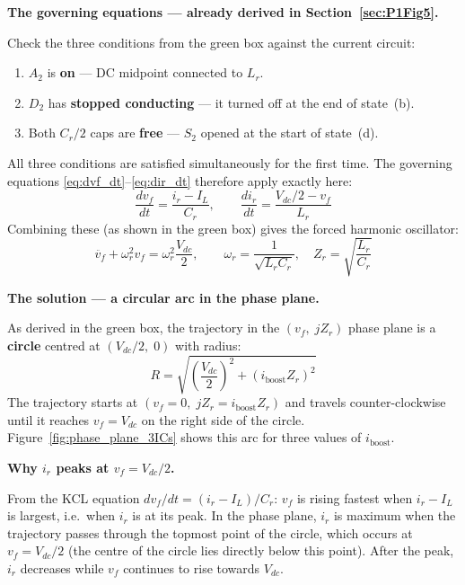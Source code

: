 \documentclass[12pt, a4paper]{article}
\def\,{ }%
\newcommand{\Vdc}{V_{dc}}
\newcommand{\vf}{v_f}
\newcommand{\ir}{i_r}
\newcommand{\IL}{I_L}
\newcommand{\Lr}{L_r}
\newcommand{\Cr}{C_r}
\newcommand{\omegar}{\omega_r}
\newcommand{\Zr}{Z_r}
\newcommand{\figref}[1]{Figure~\ref{#1}}
\begin{document}
\medskip
\textbf{The governing equations --- already derived in Section~\ref{sec:P1Fig5}.}

Check the three conditions from the green box against the current circuit:
\begin{enumerate}
    \item $A_2$ is \textbf{on} --- DC midpoint connected to $\Lr$. \checkmark
    \item $D_2$ has \textbf{stopped conducting} --- it turned off at the
          end of state~(b). \checkmark
    \item Both $\Cr/2$ caps are \textbf{free} --- $S_2$ opened at the
          start of state~(d). \checkmark
\end{enumerate}
All three conditions are satisfied simultaneously for the first time.
The governing equations \eqref{eq:dvf_dt}--\eqref{eq:dir_dt} therefore
apply exactly here:
\begin{equation*}
    \frac{d\vf}{dt} = \frac{\ir - \IL}{\Cr}, \qquad
    \frac{d\ir}{dt} = \frac{\Vdc/2 - \vf}{\Lr}
\end{equation*}
Combining these (as shown in the green box) gives the forced harmonic
oscillator:
\begin{equation*}
    \ddot{\vf} + \omegar^2\,\vf = \omegar^2\,\frac{\Vdc}{2},
    \qquad \omegar = \frac{1}{\sqrt{\Lr\Cr}},\quad \Zr = \sqrt{\frac{\Lr}{\Cr}}
\end{equation*}

\medskip
\textbf{The solution --- a circular arc in the phase plane.}

As derived in the green box, the trajectory in the
$({\vf},\; j\Zr)$ phase plane is a \textbf{circle} centred at
$(\Vdc/2,\; 0)$ with radius:
\begin{equation*}
    R = \sqrt{\left(\frac{\Vdc}{2}\right)^{\!2} + (i_\text{boost}\,\Zr)^2}
\end{equation*}
The trajectory starts at $(\vf = 0,\; j\Zr = i_\text{boost}\Zr)$ and
travels counter-clockwise until it reaches $\vf = \Vdc$ on the right side
of the circle.
\figref{fig:phase_plane_3ICs} shows this arc for three values of
$i_\text{boost}$.

\medskip
\textbf{Why $\ir$ peaks at $\vf = \Vdc/2$.}

From the KCL equation $d\vf/dt = (\ir - \IL)/\Cr$:
$\vf$ is rising fastest when $\ir - \IL$ is largest, i.e.\ when $\ir$ is
at its peak.
In the phase plane, $\ir$ is maximum when the trajectory passes through
the topmost point of the circle, which occurs at $\vf = \Vdc/2$ (the
centre of the circle lies directly below this point).
After the peak, $\ir$ decreases while $\vf$ continues to rise towards
$\Vdc$.
\end{document}
